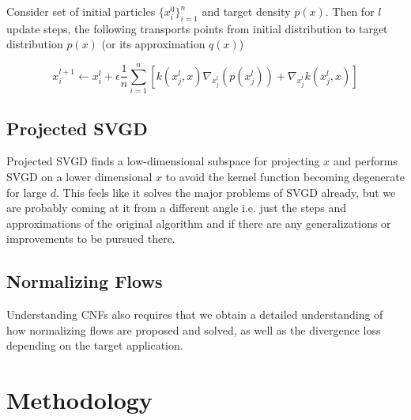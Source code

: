 \documentclass[12pt]{article}
\renewcommand{\[}{\left[}
\renewcommand{\]}{\right]}
\renewcommand{\(}{\left(}
\renewcommand{\)}{\right)}
\begin{document}
Consider set of initial particles $\{x_i^0\}_{i=1}^n$ and target density $p(x)$. Then for $l$ update steps, the following transports points from initial distribution to target distribution $p(x)$ (or its approximation $q(x)$)

$$x_i^{l+1} \leftarrow x_i^{l} + \epsilon \frac{1}{n}\sum_{i=1}^{n}\left[k(x_j^l, x) \nabla_{x_j^l}(p(x_j^l)) + \nabla_{x_j^l}k(x_j^l, x)\right]$$




\subsection{Projected SVGD}
\citep{chen_projected_2020} Projected SVGD finds a low-dimensional subspace for projecting $x$ and performs SVGD on a lower dimensional $x$ to avoid the kernel function becoming degenerate for large $d$. This feels like it solves the major problems of SVGD already, but we are probably coming at it from a different angle i.e. just the steps and approximations of the original algorithm and if there are any generalizations or improvements to be pursued there.

\subsection{Normalizing Flows}
Understanding CNFs also requires that we obtain a detailed understanding of how normalizing flows are proposed and solved, as well as the divergence loss depending on the target application. \cite{papamakarios_normalizing_2021}

\section{Methodology}
\end{document}
